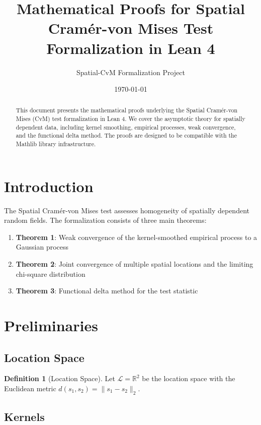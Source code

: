 \documentclass[11pt,a4paper]{article}
\title{Mathematical Proofs for Spatial Cramér-von Mises Test\\Formalization in Lean 4}
\author{Spatial-CvM Formalization Project}
\date{\today}
\theoremstyle{definition}
\newtheorem{definition}{Definition}[section]
\begin{document}
\maketitle

\begin{abstract}
This document presents the mathematical proofs underlying the Spatial Cramér-von Mises (CvM) test formalization in Lean 4. We cover the asymptotic theory for spatially dependent data, including kernel smoothing, empirical processes, weak convergence, and the functional delta method. The proofs are designed to be compatible with the Mathlib library infrastructure.
\end{abstract}

\tableofcontents

\section{Introduction}

The Spatial Cramér-von Mises test assesses homogeneity of spatially dependent random fields. The formalization consists of three main theorems:
\begin{enumerate}
    \item \textbf{Theorem 1}: Weak convergence of the kernel-smoothed empirical process to a Gaussian process
    \item \textbf{Theorem 2}: Joint convergence of multiple spatial locations and the limiting chi-square distribution
    \item \textbf{Theorem 3}: Functional delta method for the test statistic
\end{enumerate}

\section{Preliminaries}

\subsection{Location Space}

\begin{definition}[Location Space]
Let $\mathcal{L} = \mathbb{R}^2$ be the location space with the Euclidean metric $d(s_1, s_2) = \|s_1 - s_2\|_2$.
\end{definition}

\subsection{Kernels}
\end{document}
